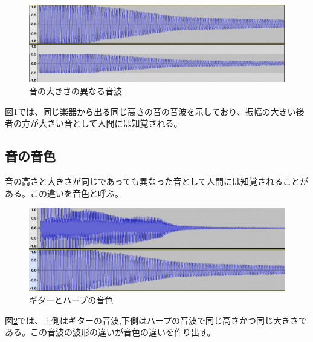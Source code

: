 \begin{figure}[t]
\begin{center}
\includegraphics[width=0.7\hsize]{figure/c4_harp_loudness.png}
\caption{音の大きさの異なる音波}
\label{fig:loudness}
\end{center}
\end{figure}

図\ref{fig:loudness}では、同じ楽器から出る同じ高さの音の音波を示しており、振幅の大きい後者の方が大きい音として人間には知覚される。

\subsection{音の音色}

音の高さと大きさが同じであっても異なった音として人間には知覚されることがある。この違いを音色と呼ぶ。

\begin{figure}[t]
\begin{center}
\includegraphics[width=0.7\hsize]{figure/c4_guitar_harp.png}
\caption{ギターとハープの音色}
\label{fig:guitar_harp_comp}
\end{center}
\end{figure}

図\ref{fig:guitar_harp_comp}では、上側はギターの音波,下側はハープの音波で同じ高さかつ同じ大きさである。この音波の波形の違いが音色の違いを作り出す。
